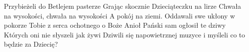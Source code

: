 \beginverse
Przybieżeli do Betlejem pasterze
Grając skocznie Dzieciąteczku na lirze
\endverse
\beginchorus
Chwała na wysokości, chwała na wysokości
A pokój na ziemi.
\endchorus
\beginverse
Oddawali swe ukłony w pokorze
Tobie z serca ochotnego o Boże
\endverse
\beginverse
Anioł Pański sam ogłosił te dziwy
Których oni nie słyszeli jak żywi
\endverse
\beginverse
Dziwili się napowietrznej muzyce
i myśleli co to będzie za Dziecię?
\endverse
\endsong
